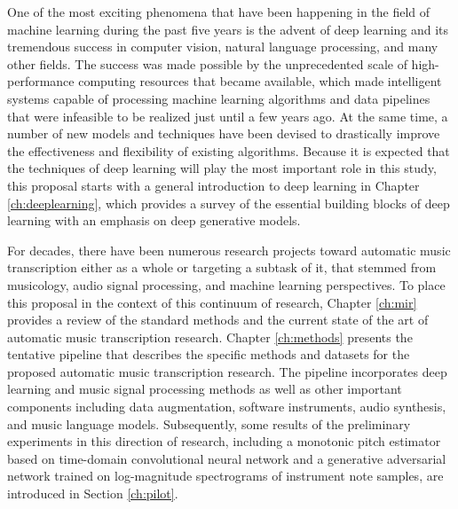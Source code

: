 One of the most exciting phenomena that have been happening in the field of machine learning during the past five years is the advent of deep learning and its tremendous success in computer vision, natural language processing, and many other fields.
The success was made possible by the unprecedented scale of high-performance computing resources that became available, which made intelligent systems capable of processing machine learning algorithms and data pipelines that were infeasible to be realized just until a few years ago.
At the same time, a number of new models and techniques have been devised to drastically improve the effectiveness and flexibility of existing algorithms.
Because it is expected that the techniques of deep learning will play the most important role in this study, this proposal starts with a general introduction to deep learning in Chapter \ref{ch:deeplearning}, which provides a survey of the essential building blocks of deep learning with an emphasis on deep generative models.


For decades, there have been numerous research projects toward automatic music transcription either as a whole or targeting a subtask of it, that stemmed from musicology, audio signal processing, and machine learning perspectives.
To place this proposal in the context of this continuum of research, Chapter \ref{ch:mir} provides a review of the standard methods and the current state of the art of automatic music transcription research.
Chapter \ref{ch:methods} presents the tentative pipeline that describes the specific methods and datasets for the proposed automatic music transcription research.
The pipeline incorporates deep learning and music signal processing methods as well as other important components including data augmentation, software instruments, audio synthesis, and music language models.
Subsequently, some results of the preliminary experiments in this direction of research, including a monotonic pitch estimator based on time-domain convolutional neural network and a generative adversarial network trained on log-magnitude spectrograms of instrument note samples, are introduced in Section \ref{ch:pilot}.
